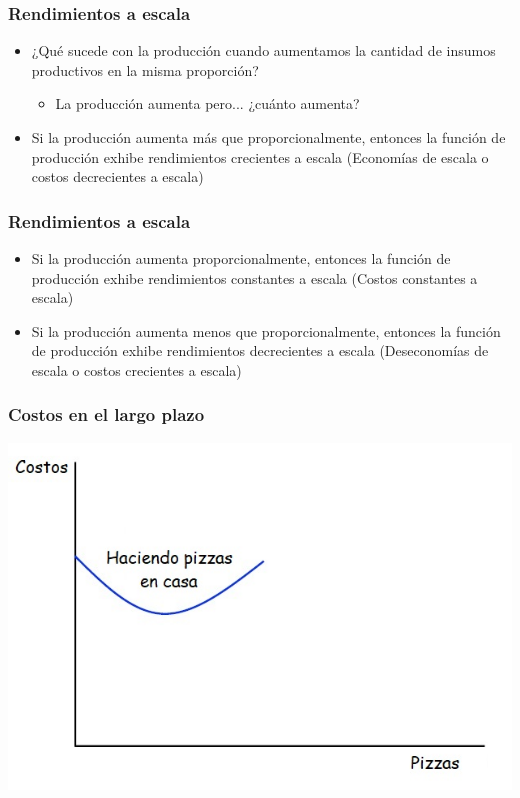 \documentclass{beamer}
\begin{document}
\begin{frame}
\frametitle{Rendimientos a escala}
\begin{itemize}
    \item ¿Qué sucede con la producción cuando aumentamos la cantidad de insumos productivos en la misma proporción?\vspace{2mm}
    \begin{itemize}
        \item La producción aumenta pero... ¿cuánto aumenta?\vspace{4mm}
    \end{itemize}
    \item Si la producción aumenta más que proporcionalmente, entonces la función de producción exhibe rendimientos crecientes a escala (Economías de escala o costos decrecientes a escala)
\end{itemize}
\end{frame}

\begin{frame}
\frametitle{Rendimientos a escala}
\begin{itemize}
    \item Si la producción aumenta proporcionalmente, entonces la función de producción exhibe rendimientos constantes a escala (Costos constantes a escala)\vspace{4mm}
    \item Si la producción aumenta menos que proporcionalmente, entonces la función de producción exhibe rendimientos decrecientes a escala (Deseconomías de escala o costos crecientes a escala)
\end{itemize}
\end{frame}

\begin{frame}
\frametitle{Costos en el largo plazo}
\centering
\includegraphics[scale=0.6]{Slides Principios de Economia/Figures/Tema_06.24.jpg}
\end{frame}
\end{document}

